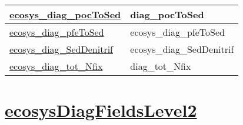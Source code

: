 {\begin{center}
\begin{longtable}{| p{2.0in} | p{4.0in} |}
    \hline
    \hyperref[subsec:var_sec_ecosysDiagFieldsLevel1_ecosys_diag_pocToSed]{ecosys\_diag\_pocToSed} & diag\_pocToSed \\
    \hline
    \hyperref[subsec:var_sec_ecosysDiagFieldsLevel1_ecosys_diag_pfeToSed]{ecosys\_diag\_pfeToSed} & ecosys\_diag\_pfeToSed \\
    \hline
    \hyperref[subsec:var_sec_ecosysDiagFieldsLevel1_ecosys_diag_SedDenitrif]{ecosys\_diag\_SedDenitrif} & ecosys\_diag\_SedDenitrif \\
    \hline
    \hyperref[subsec:var_sec_ecosysDiagFieldsLevel1_ecosys_diag_tot_Nfix]{ecosys\_diag\_tot\_Nfix} & diag\_tot\_Nfix \\
    \hline
\end{longtable}
\end{center}
}
\section[ecosysDiagFieldsLevel2]{\hyperref[sec:var_sec_ecosysDiagFieldsLevel2]{ecosysDiagFieldsLevel2}}
\label{sec:var_tab_ecosysDiagFieldsLevel2}
\vspace{0.5in}
